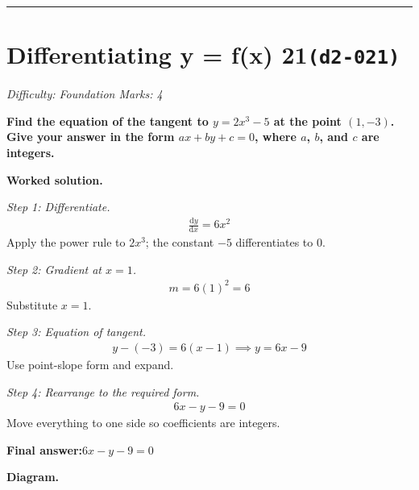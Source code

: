 \documentclass[11pt]{article}
\newcommand{\question}[1]{\par\medskip\noindent\textbf{#1}\par}
\begin{document}
\medskip\hrule

\section*{Differentiating y = f(x) 21\quad\small\texttt{(d2-021)}}
\textit{Difficulty: Foundation \quad\textbar\quad Marks: 4}

\question{Find the equation of the tangent to \( y = 2x^3 - 5 \) at the point \( (1, -3) \). Give your answer in the form \( ax + by + c = 0 \), where \( a \), \( b \), and \( c \) are integers.}

\textbf{Worked solution.}

\textit{Step 1: Differentiate.}
\[\begin{gathered}
\frac{\mathrm{d}y}{\mathrm{d}x} = 6x^2
\end{gathered}\]
Apply the power rule to \( 2x^3 \); the constant \(-5\) differentiates to \(0\).

\textit{Step 2: Gradient at \( x = 1 \).}
\[\begin{gathered}
m = 6(1)^2 = 6
\end{gathered}\]
Substitute \( x = 1 \).

\textit{Step 3: Equation of tangent.}
\[\begin{gathered}
y - (-3) = 6(x - 1) \implies y = 6x - 9
\end{gathered}\]
Use point-slope form and expand.

\textit{Step 4: Rearrange to the required form.}
\[\begin{gathered}
6x - y - 9 = 0
\end{gathered}\]
Move everything to one side so coefficients are integers.

\begin{answerbox}
\textbf{Final answer:}\quad \(\displaystyle  6x - y - 9 = 0 \)
\end{answerbox}
\textbf{Diagram.}
\end{document}
